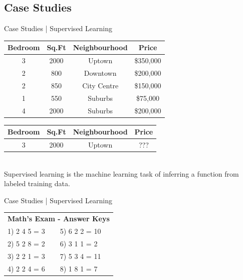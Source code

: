 \documentclass[10pt]{beamer}
\begin{document}
		\subsection{Case Studies}
			\begin{frame}{Case Studies | Supervised Learning}
				\begin{center}
					\begin{tabular}{|c|c|c|c|}							\hline 
						\bfseries{Bedroom} & \bfseries{Sq.Ft} & \bfseries{Neighbourhood} & \bfseries{Price}\\ 	\hline
						3       & 2000  & Uptown        & \$350,000 \\ 	\hline 
						2       & 800   & Downtown      & \$200,000 \\ 	\hline 
						2       & 850   & City Centre   & \$150,000 \\ 	\hline 
						1       & 550   & Suburbs       & \$75,000 \\	\hline 
						4       & 2000  & Suburbs       & \$200,000 \\	\hline 
					\end{tabular}
					\bigskip %
					\begin{tabular}{|c|c|c|c|}							\hline 
						\bfseries{Bedroom} & \bfseries{Sq.Ft} & \bfseries{Neighbourhood} & \bfseries{Price}\\ 	\hline
						3   	& 2000  & Uptown        & ???\\			\hline 
					\end{tabular} \\
					\bigskip
					Supervised learning is the machine learning task of inferring a function from labeled training data.
				\end{center} 
			\end{frame}
			\begin{frame}{Case Studies | Supervised Learning}
				\begin{center}
					\begin{tabular}{|l l|}\hline 
						\multicolumn{2}{|c|}{\textbf{Math's Exam - Answer Keys}}\\
						1) 2 4 5 = 3 & 5) 6 2 2 = 10 \\ 
						2) 5 2 8 = 2 & 6) 3 1 1 = 2  \\ 
						3) 2 2 1 = 3 & 7) 5 3 4 = 11 \\ 
						4) 2 2 4 = 6 & 8) 1 8 1 = 7  \\ \hline
					\end{tabular} 
				\end{center}
			\end{frame}
\end{document}
